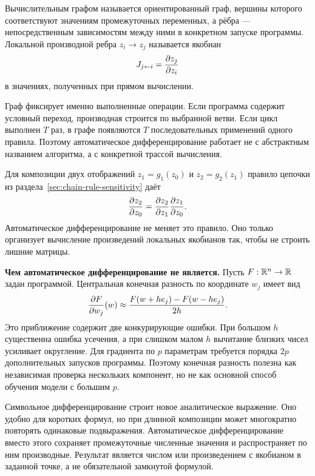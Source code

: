 \begin{definition}
Вычислительным графом называется ориентированный граф, вершины которого соответствуют значениям промежуточных переменных, а рёбра --- непосредственным зависимостям между ними в конкретном запуске программы. Локальной производной ребра $z_i\to z_j$ называется якобиан
\begin{equation}
 J_{j\leftarrow i}
 =
 \frac{\partial z_j}{\partial z_i}
\end{equation}
в значениях, полученных при прямом вычислении.
\end{definition}

Граф фиксирует именно выполненные операции. Если программа содержит условный переход, производная строится по выбранной ветви. Если цикл выполнен $T$ раз, в графе появляются $T$ последовательных применений одного правила. Поэтому автоматическое дифференцирование работает не с абстрактным названием алгоритма, а с конкретной трассой вычисления.

Для композиции двух отображений $z_1=g_1(z_0)$ и $z_2=g_2(z_1)$ правило цепочки из раздела~\ref{sec:chain-rule-sensitivity} даёт
\begin{equation}
 \frac{\partial z_2}{\partial z_0}
 =
 \frac{\partial z_2}{\partial z_1}
 \frac{\partial z_1}{\partial z_0}.
\end{equation}
Автоматическое дифференцирование не меняет это правило. Оно только организует вычисление произведений локальных якобианов так, чтобы не строить лишние матрицы.

\medskip
\noindent\textbf{Чем автоматическое дифференцирование не является.}
Пусть $F:\mathbb{R}^n\to\mathbb{R}$ задан программой. Центральная конечная разность по координате $w_j$ имеет вид
\begin{equation}
 \frac{\partial F}{\partial w_j}(w)
 \approx
 \frac{F(w+h e_j)-F(w-h e_j)}{2h}.
\end{equation}
Это приближение содержит две конкурирующие ошибки. При большом $h$ существенна ошибка усечения, а при слишком малом $h$ вычитание близких чисел усиливает округление. Для градиента по $p$ параметрам требуется порядка $2p$ дополнительных запусков программы. Поэтому конечная разность полезна как независимая проверка нескольких компонент, но не как основной способ обучения модели с большим $p$.

Символьное дифференцирование строит новое аналитическое выражение. Оно удобно для коротких формул, но при длинной композиции может многократно повторять одинаковые подвыражения. Автоматическое дифференцирование вместо этого сохраняет промежуточные численные значения и распространяет по ним производные. Результат является числом или произведением с якобианом в заданной точке, а не обязательной замкнутой формулой.

